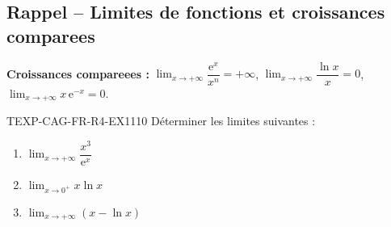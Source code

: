 

\subsection*{Rappel -- Limites de fonctions et croissances comparees}

\textbf{Croissances compareees :} $\lim_{x \to +\infty} \dfrac{\mathrm{e}^x}{x^n} = +\infty$, $\lim_{x \to +\infty} \dfrac{\ln x}{x} = 0$, $\lim_{x \to +\infty} x\,\mathrm{e}^{-x} = 0$.

\begin{exercice}{TEXP-CAG-FR-R4-EX1}{1}{10}
Déterminer les limites suivantes :
\begin{enumerate}
  \item $\lim_{x \to +\infty} \dfrac{x^3}{\mathrm{e}^x}$
  \item $\lim_{x \to 0^+} x \ln x$
  \item $\lim_{x \to +\infty} \left(x - \ln x\right)$
\end{enumerate}
\end{exercice}

